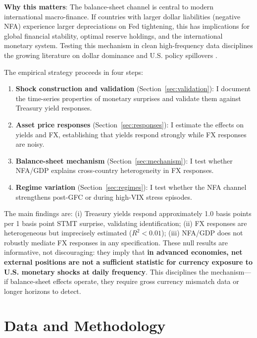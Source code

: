 \documentclass[12pt]{article}
\begin{document}
\textbf{Why this matters}: The balance-sheet channel is central to modern international macro-finance. If countries with larger dollar liabilities (negative NFA) experience larger depreciations on Fed tightening, this has implications for global financial stability, optimal reserve holdings, and the international monetary system. Testing this mechanism in clean high-frequency data disciplines the growing literature on dollar dominance and U.S. policy spillovers \citep{gopinath2020dominant}.

The empirical strategy proceeds in four steps:
\begin{enumerate}
    \item \textbf{Shock construction and validation} (Section~\ref{sec:validation}): I document the time-series properties of monetary surprises and validate them against Treasury yield responses.
    \item \textbf{Asset price responses} (Section~\ref{sec:responses}): I estimate the effects on yields and FX, establishing that yields respond strongly while FX responses are noisy.
    \item \textbf{Balance-sheet mechanism} (Section~\ref{sec:mechanism}): I test whether NFA/GDP explains cross-country heterogeneity in FX responses.
    \item \textbf{Regime variation} (Section~\ref{sec:regimes}): I test whether the NFA channel strengthens post-GFC or during high-VIX stress episodes.
\end{enumerate}

The main findings are: (i) Treasury yields respond approximately 1.0 basis points per 1 basis point STMT surprise, validating identification; (ii) FX responses are heterogeneous but imprecisely estimated ($R^2 < 0.01$); (iii) NFA/GDP does not robustly mediate FX responses in any specification. These null results are informative, not discouraging: they imply that \textbf{in advanced economies, net external positions are not a sufficient statistic for currency exposure to U.S. monetary shocks at daily frequency}. This disciplines the mechanism---if balance-sheet effects operate, they require gross currency mismatch data or longer horizons to detect.

\section{Data and Methodology}
\end{document}
